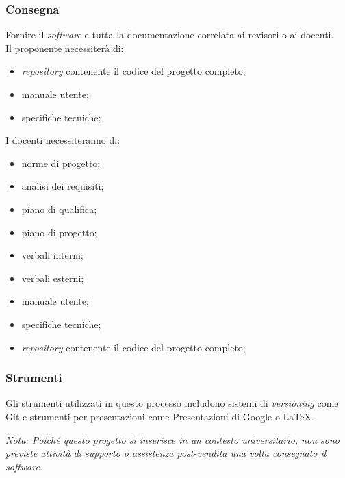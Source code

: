 \subsubsection{Consegna} 
Fornire il \textit{software} e tutta la documentazione correlata ai revisori o ai docenti. \\
Il proponente necessiterà di:
\begin{itemize}
	\item \textit{repository} contenente il codice del progetto completo;
	\item manuale utente;
	\item specifiche tecniche;
\end{itemize}
I docenti necessiteranno di:
\begin{itemize}
	\item norme di progetto;
	\item analisi dei requisiti;
	\item piano di qualifica;
	\item piano di progetto;
	\item verbali interni;
	\item verbali esterni;
	\item manuale utente;
	\item specifiche tecniche;
	\item \textit{repository} contenente il codice del progetto completo;
\end{itemize}

\subsubsection{Strumenti}
Gli strumenti utilizzati in questo processo includono sistemi di
\textit{versioning} come Git e strumenti per presentazioni come Presentazioni di Google o LaTeX.

\textit{Nota: Poiché questo progetto si inserisce in un contesto universitario,
	non sono previste attività di supporto o assistenza post-vendita una volta
	consegnato il \textit{software}.}
